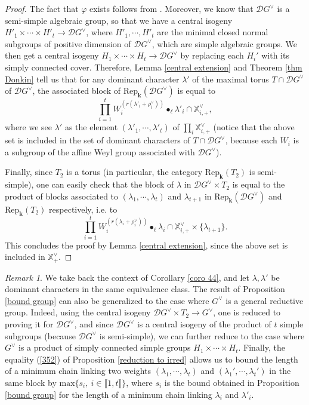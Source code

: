 \documentclass[11pt]{amsart}
\theoremstyle{plain}
\theoremstyle{remark}
\newtheorem{rem}[thm]{Remark}
\numberwithin{equation}{section}
\begin{document}
	\begin{proof}
		The fact that $\varphi$ exists follows from \cite[II.1.18]{jantzen2003representations}. Moreover, we know that $\mathcal{D}G^\vee$ is a semi-simple algebraic group, so that we have a central isogeny $H'_1\times\cdots\times H'_t\to \mathcal{D}G^\vee$, where $H'_1,\cdots,H'_t$ are the minimal closed normal subgroups of positive dimension of $\mathcal{D}G^\vee$, which are simple algebraic groups. We then get a central isogeny $H_1\times\cdots\times H_t\to \mathcal{D}G^\vee$ by replacing each $H_i'$ with its simply connected cover. Therefore, Lemma \ref{central extension} and Theorem \ref{thm Donkin} tell us that for any dominant character $\lambda'$ of the maximal torus $T\cap\mathcal{D}G^\vee$ of $\mathcal{D}G^\vee$, the associated block of $\mathrm{Rep}_\mathbf{k}(\mathcal{D}G^\vee)$ is equal to 
		$$\prod_{i=1}^tW_i^{(r(\lambda'_i+\rho^\vee_i))}\bullet_\ell\lambda'_i\cap \mathbb{X}^\vee_{i,+}, $$
		where we see $\lambda'$ as the element $(\lambda'_1,\cdots,\lambda'_t)$ of $\prod_i\mathbb{X}^\vee_{i,+}$ (notice that the above set is included in the set of dominant characters of $T\cap\mathcal{D}G^\vee$, because each $W_i$ is a subgroup of the affine Weyl group associated with $\mathcal{D}G^\vee$). 
		
		Finally, since $T_2$ is a torus (in particular, the category $\mathrm{Rep}_\mathbf{k}(T_2)$ is semi-simple), one can easily check that the block of $\lambda$ in $\mathcal{D}G^\vee\times T_2$ is equal to the product of blocks associated to $(\lambda_1,\cdots,\lambda_t)$ and $\lambda_{t+1}$ in $\mathrm{Rep}_\mathbf{k}(\mathcal{D}G^\vee)$ and $\mathrm{Rep}_\mathbf{k}(T_2)$ respectively, i.e. to
		$$\prod_{i=1}^tW_i^{(r(\lambda_i+\rho^\vee_i))}\bullet_\ell\lambda_i\cap \mathbb{X}^\vee_{i,+}\times\{\lambda_{t+1}\}. $$
		This concludes the proof by Lemma \ref{central extension}, since the above set is included in $\mathbb{X}^\vee_+$.
	\end{proof}
	\begin{rem}
		We take back the context of Corollary \ref{coro 44}, and let $\lambda,\lambda'$ be dominant characters in the same equivalence class. The result of Proposition \ref{bound group} can also be generalized to the case where $G^\vee$ is a general reductive group. Indeed, using the central isogeny $\mathcal{D}G^\vee\times T_2\to G^\vee$, one is reduced to proving it for $\mathcal{D}G^\vee$, and since $\mathcal{D}G^\vee$ is a central isogeny of the product of $t$ simple subgroups (because $\mathcal{D}G^\vee$ is semi-simple), we can further reduce to the case where $G^\vee$ is a product of simply connected simple groups $H_1\times\cdots\times H_t$. Finally, the equality (\ref{352}) of Proposition \ref{reduction to irred} allows us to bound the length of a minimum chain linking two weights $(\lambda_1,\cdots,\lambda_t)$ and $(\lambda_1',\cdots,\lambda_t')$ in the same block by $\mathrm{max}\{s_i,~i\in \llbracket1,t\rrbracket\}$, where $s_i$ is the bound obtained in  Proposition \ref{bound group} for the length of a minimum chain linking $\lambda_i$ and $\lambda'_i$.
	\end{rem} 
\end{document}
